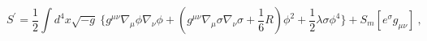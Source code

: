 \begin{equation}
S^{'}=\frac{1}{2} \int d^{4}x \sqrt{-g}~ \{g^{\mu\nu}
\nabla_{\mu}\phi \nabla_{\nu}\phi+(g^{\mu\nu}\nabla_{\mu}\sigma
\nabla_{\nu}\sigma +\frac{1}{6} R)\phi^{2} +\frac{1}{2}\lambda
\sigma \phi^4 \}+S_{m}[e^{\sigma}g_{\mu \nu}]~,
\label{4}\end{equation} 
